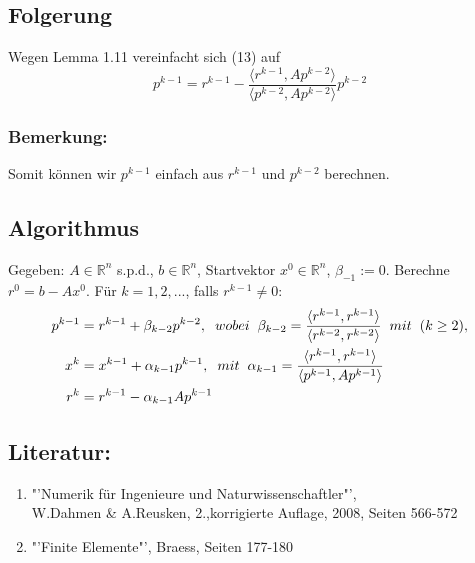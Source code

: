 \documentclass{article}
\begin{document}
\subsection{Folgerung}
Wegen Lemma 1.11 vereinfacht sich (13) auf
\begin{equation*}
p^{k-1} = r^{k-1} - \frac {\langle r^{k-1}, Ap^{k-2} \rangle} {\langle p^{k-2}, Ap^{k-2} \rangle} p^{k-2}
\end{equation*}

\subsubsection{Bemerkung:}
Somit können wir $p^{k-1}$ einfach aus $r^{k-1}$ und $p^{k-2}$ berechnen.

\subsection{Algorithmus}
Gegeben: $A \in \mathbb{R}^{n}$ s.p.d., $b \in \mathbb{R}^{n}$, Startvektor $x^{0} \in \mathbb{R}^{n}$, $\beta_{-1} := 0$. Berechne $r^{0} = b - Ax^{0}$. Für $k = 1,2,...$, falls $r^{k-1} \ne 0$:
\begin{subequations}
\begin{align}
	p^{k-1} &= r^{k-1} + \beta_{k-2}p^{k-2}, \hspace{2mm} wobei \hspace{2mm} \beta_{k-2} = \frac {\langle r^{k-1}, r^{k-1} \rangle} {\langle r^{k-2}, r^{k-2} \rangle} \hspace{2mm} mit \hspace{2mm} (k \ge 2),\\
	x^{k} &= x^{k-1} + \alpha_{k-1}p^{k-1}, \hspace{2mm} mit \hspace{2mm} \alpha_{k-1} = \frac {\langle r^{k-1}, r^{k-1} \rangle} {\langle p^{k-1}, Ap^{k-1} \rangle}\\
	r^{k} &= r^{k-1} - \alpha_{k-1}Ap^{k-1}
\end{align}
\end{subequations}

\subsection{Literatur:}
\begin{enumerate}
\item "'Numerik für Ingenieure und Naturwissenschaftler"', \\W.Dahmen \& A.Reusken, 2.,korrigierte Auflage, 2008, Seiten 566-572
\item "'Finite Elemente"', Braess, Seiten 177-180
\end{enumerate}
\end{document}
